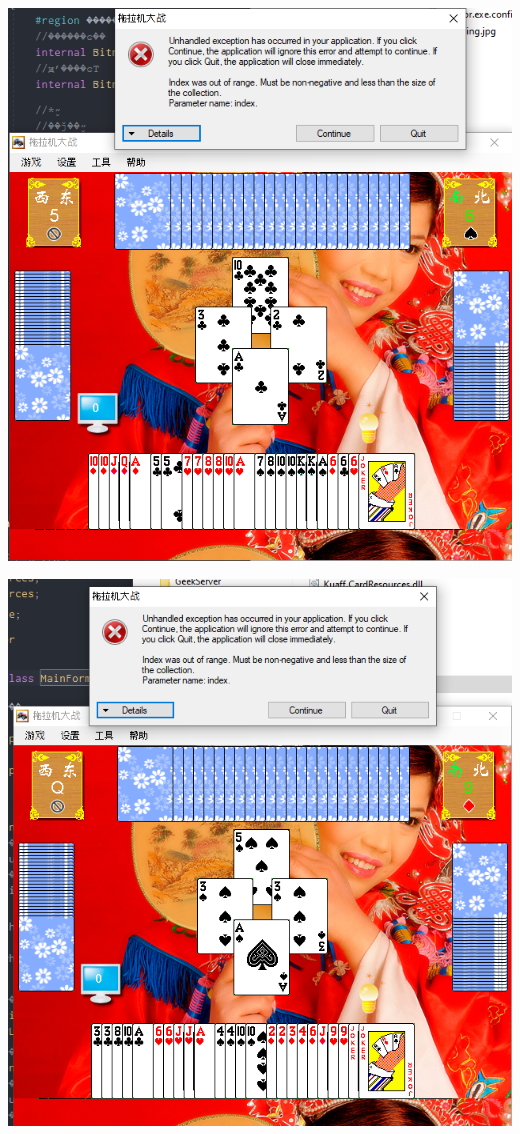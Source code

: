 \documentclass[9pt, b5paper]{article}
\begin{document}
\begin{center}
\includegraphics[width=.9\linewidth]{./pic/readme_20230510_033444.png}
\end{center}

\begin{center}
\includegraphics[width=.9\linewidth]{./pic/readme_20230510_042818.png}
\end{center}
\end{document}
